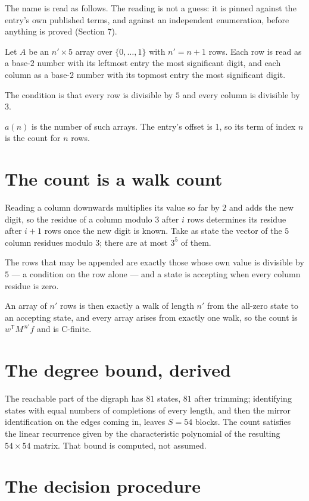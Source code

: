 \documentclass[11pt]{article}
\theoremstyle{definition}
\begin{document}
The name is read as follows. The reading is not a guess: it is pinned against the entry's own published terms, and against an independent enumeration, before anything is proved (Section 7).

Let $A$ be an $n' \times 5$ array over $\{0,\dots,1\}$ with $n' = n + 1$ rows. Each row is read as a base-$2$ number with its leftmost entry the most significant digit, and each column as a base-$2$ number with its topmost entry the most significant digit.

The condition is that every row is divisible by $5$ and every column is divisible by $3$.

$a(n)$ is the number of such arrays. The entry's offset is 1, so its term of index $n$ is the count for $n$ rows.

\section{The count is a walk count}

Reading a column downwards multiplies its value so far by $2$ and adds the new digit, so the residue of a column modulo $3$ after $i$ rows determines its residue after $i+1$ rows once the new digit is known. Take as state the vector of the $5$ column residues modulo $3$; there are at most $3^{5}$ of them.

The rows that may be appended are exactly those whose own value is divisible by $5$ --- a condition on the row alone --- and a state is accepting when every column residue is zero.

An array of $n'$ rows is then exactly a walk of length $n'$ from the all-zero state to an accepting state, and every array arises from exactly one walk, so the count is $w^{\mathsf T}M^{\,n'}f$ and is C-finite.

\section{The degree bound, derived}

The reachable part of the digraph has $81$ states, $81$ after trimming; identifying states with equal numbers of completions of every length, and then the mirror identification on the edges coming in, leaves $S = 54$ blocks. The count satisfies the linear recurrence given by the characteristic polynomial of the resulting $54\times54$ matrix. That bound is computed, not assumed.

\section{The decision procedure}
\end{document}

